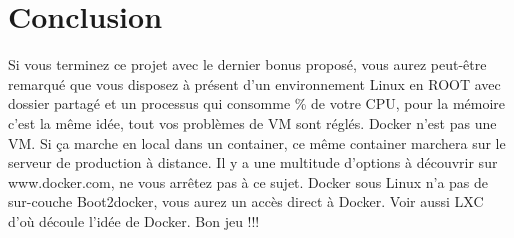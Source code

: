 \documentclass{42}
\begin{document}
\chapter{Conclusion}

Si vous terminez ce projet avec le dernier bonus proposé, vous aurez peut-être remarqué que vous disposez à présent d’un environnement Linux en ROOT avec dossier partagé et un processus qui consomme \% de votre CPU, pour la mémoire c’est la même idée, tout vos problèmes de VM sont réglés.
\newline
Docker n’est pas une VM.
\newline
\newline
Si ça marche en local dans un container, ce même container marchera sur le serveur de production à distance.
\newline
\newline
Il y a une multitude d’options à découvrir sur www.docker.com, ne vous arrêtez pas à ce sujet.
Docker sous Linux n’a pas de sur-couche Boot2docker, vous aurez un accès direct à Docker.
Voir aussi LXC d’où découle l'idée de Docker.
\newline
\newline
\newline
\newline
Bon jeu !!!




\end{document}
